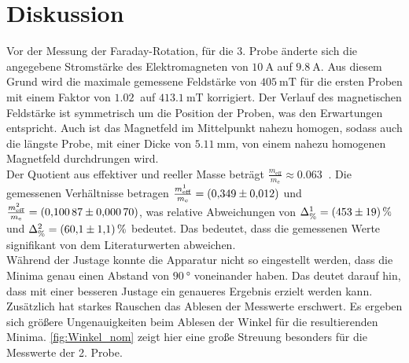 \section{Diskussion}
\label{sec:Diskussion}


Vor der Messung der Faraday-Rotation, für die 3. Probe änderte sich die angegebene Stromstärke des Elektromagneten von $\SI{10}{\ampere}$ auf $\SI{9.8}{\ampere}$.
Aus diesem Grund wird die maximale gemessene Feldstärke von $\SI{405}{\milli\tesla}$ für die ersten Proben mit einem Faktor von $\SI{1.02}{}$ auf $\SI{413.1}{\milli\tesla}$ korrigiert.
Der Verlauf des magnetischen Feldstärke ist symmetrisch um die Position der Proben, was den Erwartungen entspricht.
Auch ist das Magnetfeld im Mittelpunkt nahezu homogen, sodass auch die längste Probe, mit einer Dicke von $\SI{5.11}{\milli\meter}$, von einem nahezu homogenen Magnetfeld durchdrungen wird.\\

Der Quotient aus effektiver und reeller Masse beträgt  $\frac{m_{\text{eff}}}{m_\text{e}} \approx \SI{0.063}{}$ \cite{GrossMarx+2018}.
Die gemessenen Verhältnisse betragen $\frac{m^1_{\text{eff}}}{m_\text{e}} = \SI{0.349 \pm 0.012}{}$ und $\frac{m^2_{\text{eff}}}{m_\text{e}} = \SI{0.10087 \pm 0.00070}{}$,
was relative Abweichungen von $\Delta^1_\text{\%} = \SI{453 \pm 19}{\%}$ und $\Delta^2_\text{\%} = \SI{60.1 \pm 1.1}{\%}$ bedeutet.
Das bedeutet, dass die gemessenen Werte signifikant von dem Literaturwerten abweichen.\\



Während der Justage konnte die Apparatur nicht so eingestellt werden, dass die Minima genau einen Abstand von $\SI{90}{\degree}$ voneinander haben.
Das deutet darauf hin, dass mit einer besseren Justage ein genaueres Ergebnis erzielt werden kann.
Zusätzlich hat starkes Rauschen das Ablesen der Messwerte erschwert.  
Es ergeben sich größere Ungenauigkeiten beim Ablesen der Winkel für die resultierenden Minima.
\autoref{fig:Winkel_nom} zeigt hier eine große Streuung besonders für die Messwerte der 2. Probe.
